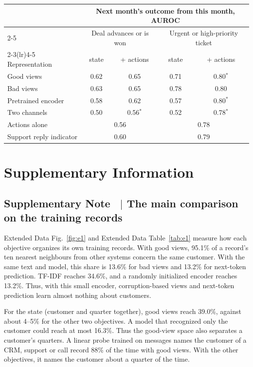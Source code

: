 \documentclass[11pt]{article}
\renewcommand{\figurename}{Fig.}
\newcounter{suppnote}
\newcommand{\suppnote}[2]{\refstepcounter{suppnote}\label{#2}\subsection{Supplementary Note \thesuppnote\ $|$ #1}}
\newcommand{\sisection}{\clearpage\setcounter{figure}{0}\setcounter{table}{0}%
  \renewcommand{\figurename}{Supplementary Fig.}\renewcommand{\tablename}{Supplementary Table}%
  \renewcommand{\theHfigure}{S\arabic{figure}}\renewcommand{\theHtable}{S\arabic{table}}}
\begin{document}
\begin{table}[h]
\setlength{\tabcolsep}{4.5pt}\begin{tabular}{lcccc}
\toprule
& \multicolumn{4}{c}{Next month's outcome from this month, AUROC} \\
\cmidrule(lr){2-5}
& \multicolumn{2}{c}{Deal advances or is won} & \multicolumn{2}{c}{Urgent or high-priority ticket} \\
\cmidrule(lr){2-3}\cmidrule(lr){4-5}
Representation & state & + actions & state & + actions \\
\midrule
Good views & 0.62 & 0.65 & 0.71 & 0.80$^{*}$ \\
Bad views & 0.63 & 0.65 & 0.78 & 0.80 \\
Pretrained encoder & 0.58 & 0.62 & 0.57 & 0.80$^{*}$ \\
Two channels & 0.50 & 0.56$^{*}$ & 0.52 & 0.78$^{*}$ \\
\midrule
Actions alone & \multicolumn{2}{c}{0.56} & \multicolumn{2}{c}{0.78} \\
Support reply indicator & \multicolumn{2}{c}{0.60} & \multicolumn{2}{c}{0.79} \\
\bottomrule
\end{tabular}
\end{table}

\sisection
\section{Supplementary Information}

\suppnote{The main comparison on the training records}{sec:e1}
Extended Data Fig.~\ref{fig:e1} and Extended Data Table~\ref{tab:e1} measure how each objective organizes its own training records. With good views, 95.1\% of a record's ten nearest neighbours from other systems concern the same customer. With the same text and model, this share is 13.6\% for bad views and 13.2\% for next-token prediction. TF-IDF reaches 34.6\%, and a randomly initialized encoder reaches 13.2\%. Thus, with this small encoder, corruption-based views and next-token prediction learn almost nothing about customers.

For the state (customer and quarter together), good views reach 39.0\%, against about 4--5\% for the other two objectives. A model that recognized only the customer could reach at most 16.3\%. Thus the good-view space also separates a customer's quarters. A linear probe trained on messages names the customer of a CRM, support or call record 88\% of the time with good views. With the other objectives, it names the customer about a quarter of the time.
\end{document}
